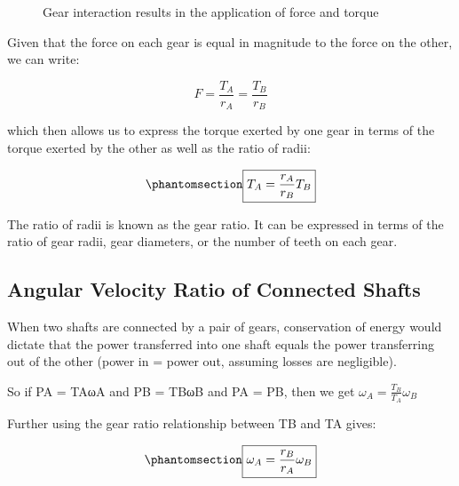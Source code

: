 \documentclass[
  letterpaper,
  DIV=11,
  numbers=noendperiod]{scrreprt}
\theoremstyle{definition}
\theoremstyle{remark}
\begin{document}
\begin{figure}


\caption{\label{fig-6.15}Gear interaction results in the application of
force and torque}

\end{figure}%

Given that the force on each gear is equal in magnitude to the force on
the other, we can write:

\[
F=\frac{T_A}{r_A}=\frac{T_B}{r_B}
\]

which then allows us to express the torque exerted by one gear in terms
of the torque exerted by the other as well as the ratio of radii:

\begin{equation}\phantomsection\label{eq-6.5}{
\boxed{T_A=\frac{r_A}{r_B} T_B}
}\end{equation}

The ratio of radii is known as the gear ratio. It can be expressed in
terms of the ratio of gear radii, gear diameters, or the number of teeth
on each gear.

\subsection{Angular Velocity Ratio of Connected
Shafts}\label{angular-velocity-ratio-of-connected-shafts}

When two shafts are connected by a pair of gears, conservation of energy
would dictate that the power transferred into one shaft equals the power
transferring out of the other (power in = power out, assuming losses are
negligible).

So if PA = TAωA and PB = TBωB and PA = PB, then we get
\(\omega_A=\frac{T_B}{T_A} \omega_B\)

Further using the gear ratio relationship between TB and TA gives:

\begin{equation}\phantomsection\label{eq-6.6}{
\boxed{\omega_A=\frac{r_B}{r_A} \omega_B}
}\end{equation}
\end{document}
